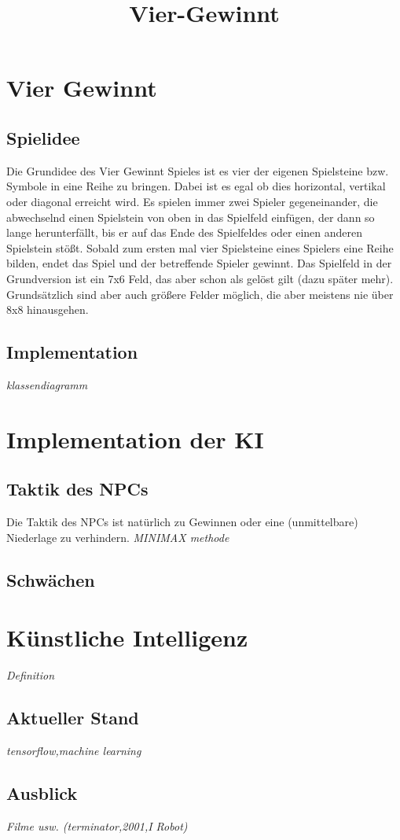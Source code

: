 \documentclass[12pt,a4paper,ngerman]{article}
\title{Vier-Gewinnt}
\author{}
\begin{document}
	\maketitle
	\tableofcontents
	\newpage
	\section{Vier Gewinnt}
	\subsection{Spielidee}
	Die Grundidee des Vier Gewinnt Spieles ist es vier der eigenen Spielsteine bzw. Symbole in eine Reihe zu bringen.
	Dabei ist es egal ob dies horizontal, vertikal oder diagonal erreicht wird.
	Es spielen immer zwei Spieler gegeneinander, die abwechselnd einen Spielstein von oben in das Spielfeld einfügen, der dann so lange herunterfällt, bis er auf das Ende des Spielfeldes oder einen anderen Spielstein stößt.
	Sobald zum ersten mal vier Spielsteine eines Spielers eine Reihe bilden, endet das Spiel und der betreffende Spieler gewinnt.
	Das Spielfeld in der Grundversion ist ein 7x6 Feld, das aber schon als gelöst gilt (dazu später mehr).
	Grundsätzlich sind aber auch größere Felder möglich, die aber meistens nie über 8x8 hinausgehen.
	\subsection{Implementation}
	\textit{klassendiagramm}
	\section{Implementation der KI}
	\subsection{Taktik des NPCs}
	Die Taktik des NPCs ist natürlich zu Gewinnen oder eine (unmittelbare) Niederlage zu verhindern.
	\textit{MINIMAX methode}
	\subsection{Schwächen}
	\section{Künstliche Intelligenz}
	\textit{Definition}
	\subsection{Aktueller Stand}
	\textit{tensorflow,machine learning}
	\subsection{Ausblick}
	\textit{Filme usw. (terminator,2001,I Robot)}
	
\end{document}
